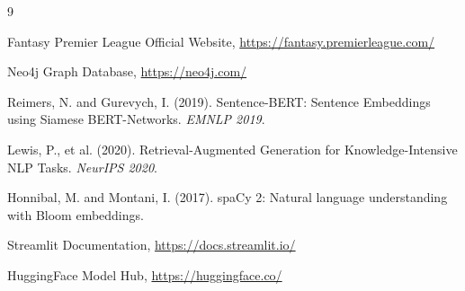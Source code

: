 \documentclass[11pt, a4paper]{article}
\begin{document}
\newpage
\begin{thebibliography}{9}

Fantasy Premier League Official Website, 
\url{https://fantasy.premierleague.com/}

Neo4j Graph Database,
\url{https://neo4j.com/}

Reimers, N. and Gurevych, I. (2019). 
Sentence-BERT: Sentence Embeddings using Siamese BERT-Networks.
\textit{EMNLP 2019}.

Lewis, P., et al. (2020).
Retrieval-Augmented Generation for Knowledge-Intensive NLP Tasks.
\textit{NeurIPS 2020}.

Honnibal, M. and Montani, I. (2017).
spaCy 2: Natural language understanding with Bloom embeddings.

Streamlit Documentation,
\url{https://docs.streamlit.io/}

HuggingFace Model Hub,
\url{https://huggingface.co/}

\end{thebibliography}
\end{document}
